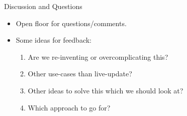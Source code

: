 \documentclass{beamer}
\begin{document}
\begin{frame}{Discussion and Questions}
  \begin{itemize}
    \item Open floor for questions/comments.
    \item Some ideas for feedback:
      \begin{enumerate}
        \item Are we re-inventing or overcomplicating this?
        \item Other use-cases than live-update?
        \item Other ideas to solve this which we should look at?
        \item Which approach to go for?
      \end{enumerate}
  \end{itemize}
\end{frame}
\end{document}
